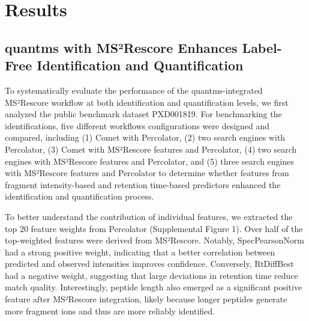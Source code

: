 \documentclass[12pt]{article}
\begin{document}
\section{Results}

\subsection{quantms with MS²Rescore Enhances Label-Free Identification and Quantification}
To systematically evaluate the performance of the quantms-integrated MS²Rescore workflow at both identification and quantification levels, we first analyzed the public benchmark dataset PXD001819. %
For benchmarking the identifications, five different workflows configurations were designed and compared, including (1) Comet with Percolator, (2) two search engines with Percolator, (3) Comet with MS²Rescore features and Percolator, (4) two search engines with MS²Rescore features and Percolator, and (5) three search engines with MS²Rescore features and Percolator to determine whether features from fragment intensity-based and retention time-based predictors enhanced the identification and quantification process. %

To better understand the contribution of individual features, we extracted the top 20 feature weights from Percolator (Supplemental Figure 1). Over half of the top-weighted features were derived from MS²Rescore. Notably, SpecPearsonNorm had a strong positive weight, indicating that a better correlation between predicted and observed intensities improves confidence. Conversely, RtDiffBest had a negative weight, suggesting that large deviations in retention time reduce match quality. Interestingly, peptide length also emerged as a significant positive feature after MS²Rescore integration, likely because longer peptides generate more fragment ions and thus are more reliably identified. %
\end{document}
